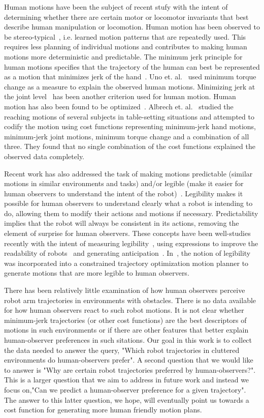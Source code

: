 \documentclass[letterpaper, 10 pt, conference]{ieeeconf}  %
\begin{document}
Human motions have been the subject of recent stufy with the intent of determining whether there are certain motor or locomotor invariants that best describe human manipulation or locomotion. Human motion has been observed to be stereo-typical~\cite{Atkeson:85}, i.e. learned motion patterns that are repeatedly used. This requires less planning of individual motions and contributes to making human motions more deterministic and predictable. The minimum jerk principle for human motions specifies that the trajectory of the human can best be represented as a motion that minimizes jerk of the hand~\cite{Flash:85}. Uno et. al.~\cite{Uno:89} used minimum torque change as a measure to explain the observed human motions. Minimizing jerk at the joint level~\cite{Rosenbaum:1995} has been another criterion used for human motion. Human motion has also been found to be optimized~\cite{Arechavaleta:2006}. Albrech et. al.~\cite{Albrecht:2011} studied the reaching motions of several subjects in table-setting situations and attempted to codify the motion using cost functions representing minimum-jerk hand motions, minimum-jerk joint motions, minimum torque change and a combination of all three. They found that no single combination of the cost functions explained the observed data completely. 

Recent work has also addressed the task of making motions predictable (similar motions in similar environments and tasks) and/or legible (make it easier for human observers to understand the intent of the robot)~\cite{Beetz:2010}. Legibility makes it possible for human observers to understand clearly what a robot is intending to do, allowing them to modify their actions and motions if necessary. Predictability implies that the robot will always be consistent in its actions, removing the element of surprise for human observers. These concepts have been well-studies recently with the intent of measuring legibility~\cite{Lichtenthaler:2011}, using expressions to improve the readability of robots~\cite{Takayama:2011} and generating anticipation~\cite{Gielniak:2011}. In~\cite{Dragan:2013}, the notion of legibility was incorporated into a constrained trajectory optimization motion planner to generate motions that are more legible to human observers. 

There has been relatively little examination of how human observers perceive robot arm trajectories in environments with obstacles. There is no data available for how human observers react to such robot motions. It is not clear whether minimum-jerk trajectories (or other cost functions) are the best descriptors of motions in such environments or if there are other features that better explain human-observer preferences in such sitations. Our goal in this work is to collect the data needed to answer the query, "Which robot trajectories in cluttered environments do human-observers prefer". A second question that we would like to answer is "Why are certain robot trajectories preferred by human-observers?". This is a larger question that we aim to address in future work and instead we focus on,"Can we predict a human-observer preference for a given trajectory". The answer to this latter question, we hope, will eventually point us towards a cost function for generating more human friendly motion plans. 
\end{document}
